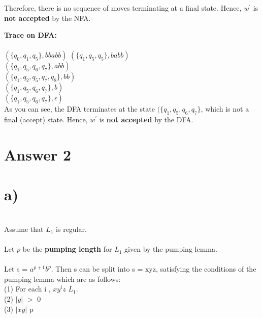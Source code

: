 \documentclass[11pt]{article}
\begin{document}
\noindent Therefore, there is no sequence of moves terminating at a final state. Hence, $w^'$ is \textbf{not accepted} by the NFA. \newpage

\noindent \textbf{Trace on DFA:} \\ \\

$(\{q_0,q_1,q_5\},bbabb)$ \vdash $(\{q_1,q_5,q_5\},babb)$ \\
\indent \indent \indent \indent \indent \indent \space \space \vdash $(\{q_1,q_5,q_6,q_7\},abb)$ \\ 
\indent \indent \indent \indent \indent \indent \space \space  \vdash $(\{q_1,q_2,q_5,q_7,
q_8\},bb)$ \\
\indent \indent \indent \indent \indent \indent \space \space  \vdash $(\{q_1,q_5,q_6,q_7\},b)$ \\
\indent \indent \indent \indent \indent \indent \space \space  \vdash $(\{q_1,q_5,q_6,q_7\},\epsilon)$ \\

\noindent As you can see, the DFA terminates at the state $(\{q_1,q_5,q_6,q_7\}$, which is not a final (accept) state. Hence, $w^'$ is \textbf{not accepted} by the DFA.












\newpage

\section*{Answer 2}

\section*{a)} \\
Assume that $L_{1}$ is regular. \\ \\
\indent Let $p$ be the \textbf{pumping length} for $L_{1}$ given by the pumping lemma. \\ \\

Let s = $a^{p+1}b^{p}$. Then s can be split into s = xyz, satisfying the conditions of the pumping lemma which are as follows: \\

(1) For each i , $ xy^{i}z $ \in $ L_{1}$. \\
\indent (2) $|y|$ $>$ 0 \\
\indent (3) $|xy|$ \leq p \\ \\
\end{document}
